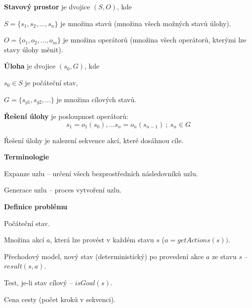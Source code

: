 \begin{compactitem}

    \item \textbf{Stavový prostor} je dvojice $(S, O)$, kde \begin{compactitem}
        \item $S = \{ s_1, s_2, \ldots, s_{n} \}$ je množina stavů (množina všech možných stavů úlohy).
        \item $O = \{ o_1, o_2, \ldots, o_{m} \}$ je množina operátorů (množina všech operátorů, kterými lze stavy úlohy měnit).
    \end{compactitem}

    \item \textbf{Úloha} je dvojice $(s_0, G)$, kde \begin{compactitem}
        \item $s_0 \in S$ je počáteční stav,
        \item $G = \{ s_{g1}, s_{g2}, \ldots \}$ je množina cílových stavů.
    \end{compactitem}

    \item \textbf{Řešení úlohy} je posloupnost operátorů:
    $$ s_1 = o_1(s_0), \ldots s_n = o_n(s_{n-1}) ~;~ s_n \in G $$
    \begin{compactitem}
        \item Řešení úlohy je nalezení sekvence akcí, které dosáhnou cíle.
    \end{compactitem}

    \item \textbf{Terminologie} \begin{compactitem}
        \item Expanze uzlu -- určení všech bezprostředních následovníků uzlu.
        \item Generace uzlu -- proces vytvoření uzlu.
    \end{compactitem}

    \item \textbf{Definice problému} \begin{compactenum}
        \item Počáteční stav.
        \item Množina akcí $a$, která lze provést v každém stavu $s$ ($a = getActions(s))$.
        \item Přechodový model, nový stav (deterministický) po provedení akce $a$ ze stavu $s$ -- $result(s, a)$.
        \item Test, je-li stav cílový -- $isGoal(s)$.
        \item Cena cesty (počet kroků v sekvenci).
    \end{compactenum}


\end{compactitem}
